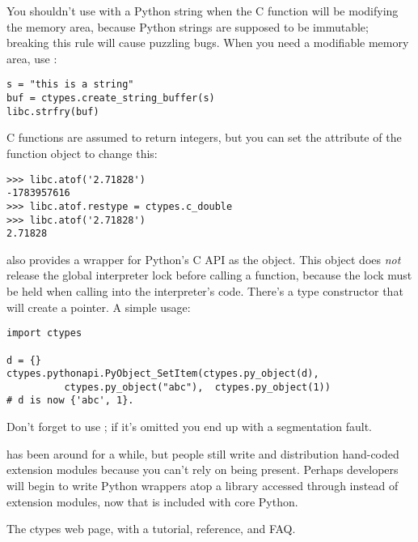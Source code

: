 \documentclass{howto}
\begin{document}
You shouldn't use  with a Python string when the C function will be modifying the memory area, because Python strings are 
supposed to be immutable; breaking this rule will cause puzzling bugs.  When you need a modifiable memory area,
use :

\begin{verbatim}
s = "this is a string"
buf = ctypes.create_string_buffer(s)
libc.strfry(buf)
\end{verbatim}

C functions are assumed to return integers, but you can set
the  attribute of the function object to 
change this:

\begin{verbatim}
>>> libc.atof('2.71828')
-1783957616
>>> libc.atof.restype = ctypes.c_double
>>> libc.atof('2.71828')
2.71828
\end{verbatim}

 also provides a wrapper for Python's C API 
as the  object.  This object does \emph{not} 
release the global interpreter lock before calling a function, because the lock must be held when calling into the interpreter's code.  
There's a  type constructor that will create a 
 pointer.  A simple usage:

\begin{verbatim}
import ctypes

d = {}
ctypes.pythonapi.PyObject_SetItem(ctypes.py_object(d),
          ctypes.py_object("abc"),  ctypes.py_object(1))
# d is now {'abc', 1}.
\end{verbatim}

Don't forget to use ; if it's omitted you end 
up with a segmentation fault.

 has been around for a while, but people still write 
and distribution hand-coded extension modules because you can't rely on  being present.
Perhaps developers will begin to write 
Python wrappers atop a library accessed through  instead
of extension modules, now that  is included with core Python.

\begin{seealso}

{The ctypes web page, with a tutorial, reference, and FAQ.}


\end{seealso}
\end{document}
